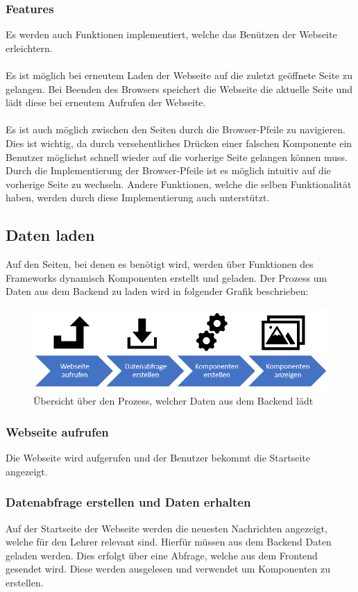 \subsubsection{Features}
\label{sec:feature}
Es werden auch Funktionen implementiert, welche das Benützen der Webseite erleichtern.
\\\\
Es ist möglich bei erneutem Laden der Webseite auf die zuletzt geöffnete Seite zu gelangen. Bei Beenden des Browsers speichert die Webseite die aktuelle Seite und lädt diese bei erneutem Aufrufen der Webseite.
\\\\
Es ist auch möglich zwischen den Seiten durch die Browser-Pfeile zu navigieren. Dies ist wichtig, da durch versehentliches Drücken einer falschen Komponente ein Benutzer möglichst schnell wieder auf die vorherige Seite gelangen können muss. Durch die Implementierung der Browser-Pfeile ist es möglich intuitiv auf die vorherige Seite zu wechseln. Andere Funktionen, welche die selben Funktionalität haben, werden durch diese Implementierung auch unterstützt.
\newpage
\subsection{Daten laden}
Auf den Seiten, bei denen es benötigt wird, werden über Funktionen des Frameworks dynamisch Komponenten erstellt und geladen. Der Prozess um Daten aus dem Backend zu laden wird in folgender Grafik beschrieben:
\begin{figure}[H]
	\centering
	\includegraphics[width=0.8\linewidth]{images/Prozess_Daten_laden}
	\caption[Prozess der Daten zur Anzeige]{Übersicht über den Prozess, welcher Daten aus dem Backend lädt}
	\label{fig:prozessdatenladen}
\end{figure}

\subsubsection{Webseite aufrufen}
Die Webseite wird aufgerufen und der Benutzer bekommt die Startseite angezeigt.

\subsubsection{Datenabfrage erstellen und Daten erhalten}
Auf der Startseite der Webseite werden die neuesten Nachrichten angezeigt, welche für den Lehrer relevant sind. Hierfür müssen aus dem Backend Daten geladen werden. Dies erfolgt über eine Abfrage, welche aus dem Frontend gesendet wird. Diese werden ausgelesen und verwendet um Komponenten zu erstellen.

